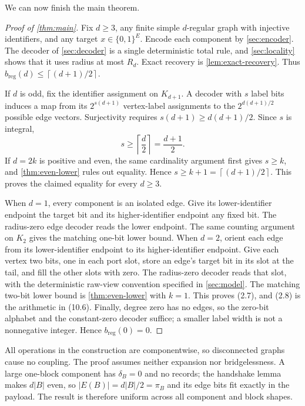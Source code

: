 \documentclass[11pt]{article}
\theoremstyle{definition}
\theoremstyle{remark}
\newcommand{\bits}{\{0,1\}}
\newcommand{\ceil}[1]{\left\lceil #1\right\rceil}
\begin{document}
We can now finish the main theorem.

\begin{proof}[Proof of \cref{thm:main}]
Fix $d\ge3$, any finite simple $d$-regular graph with injective
identifiers, and any target $x\in\bits^E$.  Encode each component by
\cref{sec:encoder}.  The decoder of \cref{sec:decoder} is a single
deterministic total rule, and \cref{sec:locality} shows that it uses radius
at most $R_d$.  Exact recovery is \cref{lem:exact-recovery}.  Thus
$b_{\mathrm{reg}}(d)\le\ceil{(d+1)/2}$.

If $d$ is odd, fix the identifier assignment on $K_{d+1}$.  A decoder with
$s$ label bits induces a map from its $2^{s(d+1)}$ vertex-label assignments
to the $2^{d(d+1)/2}$ possible edge vectors.  Surjectivity requires
$s(d+1)\ge d(d+1)/2$.  Since $s$ is integral,
\[
                          s\ge\ceil{\frac d2}=\frac{d+1}{2}.
\]
If $d=2k$ is positive and even, the same cardinality argument first gives
$s\ge k$, and \cref{thm:even-lower} rules out equality.  Hence
$s\ge k+1=\ceil{(d+1)/2}$.  This proves the claimed equality for every
$d\ge3$.

When $d=1$, every component is an isolated edge.  Give its lower-identifier
endpoint the target bit and its higher-identifier endpoint any fixed bit.
The radius-zero edge decoder reads the lower endpoint.  The same counting
argument on $K_2$ gives the matching one-bit lower bound.  When $d=2$,
orient each edge from its lower-identifier endpoint to its higher-identifier
endpoint.  Give each vertex two bits, one in each port slot, store an
edge's target bit in its slot at the tail, and fill the other slots with
zero.  The radius-zero decoder reads that slot, with the deterministic
raw-view convention specified in \cref{sec:model}.  The matching two-bit lower bound is \cref{thm:even-lower} with
$k=1$.  This proves (2.7), and (2.8) is the arithmetic in (10.6).
Finally, degree zero has no edges, so the zero-bit alphabet and the
constant-zero decoder suffice; a smaller label width is not a nonnegative
integer.  Hence $b_{\mathrm{reg}}(0)=0$.
\end{proof}

All operations in the construction are componentwise, so disconnected
graphs cause no coupling.  The proof assumes neither expansion nor
bridgelessness.  A large one-block component has $\delta_B=0$ and no records;
the handshake lemma makes $d|B|$ even, so
$|E(B)|=d|B|/2=\pi_B$ and its edge bits fit exactly in the payload.  The
result is therefore uniform across all component and block shapes.
\end{document}
